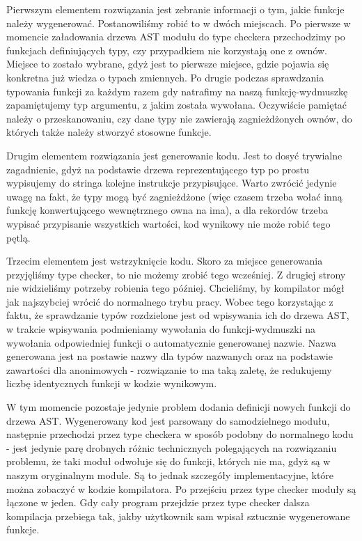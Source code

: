 \documentclass[licencjacka]{pracamgr}
\begin{document}
Pierwszym elementem rozwiązania jest zebranie informacji o tym, jakie funkcje należy wygenerować. Postanowiliśmy robić to w dwóch miejscach.
Po pierwsze w momencie załadowania drzewa AST modułu do type checkera przechodzimy po funkcjach definiujących typy, czy przypadkiem nie korzystają one z ownów.
Miejsce to zostało wybrane, gdyż jest to pierwsze miejsce, gdzie pojawia się konkretna już wiedza o typach zmiennych.
Po drugie podczas sprawdzania typowania funkcji za każdym razem gdy natrafimy na naszą funkcję-wydmuszkę zapamiętujemy typ argumentu, z jakim została wywołana.
Oczywiście pamiętać należy o przeskanowaniu, czy dane typy nie zawierają zagnieżdżonych ownów, do których także należy stworzyć stosowne funkcje.

Drugim elementem rozwiązania jest generowanie kodu. Jest to dosyć trywialne zagadnienie, gdyż na podstawie drzewa reprezentującego typ
po prostu wypisujemy do stringa kolejne instrukcje przypisujące. Warto zwrócić jedynie uwagę na fakt, że typy mogą być zagnieżdżone
(więc czasem trzeba wołać inną funkcję konwertującego wewnętrznego owna na ima), a dla rekordów trzeba wypisać przypisanie wszystkich wartości, kod wynikowy nie może robić tego pętlą.

Trzecim elementem jest wstrzyknięcie kodu. Skoro za miejsce generowania przyjęliśmy type checker, to nie możemy zrobić tego wcześniej.
Z drugiej strony nie widzieliśmy potrzeby robienia tego później. Chcieliśmy, by kompilator mógł jak najszybciej wrócić do normalnego trybu pracy.
Wobec tego korzystając z faktu, że sprawdzanie typów rozdzielone jest od wpisywania ich do drzewa AST, w trakcie wpisywania podmieniamy wywołania do funkcji-wydmuszki na wywołania
odpowiedniej funkcji o automatycznie generowanej nazwie. Nazwa generowana jest na postawie nazwy dla typów nazwanych oraz na podstawie zawartości
dla anonimowych - rozwiązanie to ma taką zaletę, że redukujemy liczbę identycznych funkcji w kodzie wynikowym.

W tym momencie pozostaje jedynie problem dodania definicji nowych funkcji do drzewa AST. Wygenerowany kod jest parsowany do samodzielnego modułu,
następnie przechodzi przez type checkera w sposób podobny do normalnego kodu - jest jedynie parę drobnych różnic technicznych polegających na rozwiązaniu problemu,
że taki moduł odwołuje się do funkcji, których nie ma, gdyż są w naszym oryginalnym module. Są to jednak szczegóły implementacyjne, które można zobaczyć
w kodzie kompilatora. Po przejściu przez type checker moduły są łączone w jeden. Gdy cały program przejdzie przez type checker
dalsza kompilacja przebiega tak, jakby użytkownik sam wpisał sztucznie wygenerowane funkcje.
\end{document}
